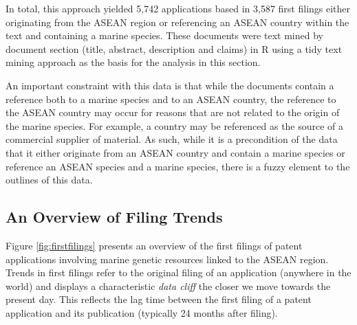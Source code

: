 \documentclass[]{book}
\theoremstyle{definition}
\theoremstyle{definition}
\theoremstyle{definition}
\theoremstyle{remark}
\begin{document}
In total, this approach yielded 5,742 applications based in 3,587 first
filings either originating from the ASEAN region or referencing an ASEAN
country within the text and containing a marine species. These documents
were text mined by document section (title, abstract, description and
claims) in R using a tidy text mining approach as the basis for the
analysis in this section.

An important constraint with this data is that while the documents
contain a reference both to a marine species and to an ASEAN country,
the reference to the ASEAN country may occur for reasons that are not
related to the origin of the marine species. For example, a country may
be referenced as the source of a commercial supplier of material. As
such, while it is a precondition of the data that it either originate
from an ASEAN country and contain a marine species or reference an ASEAN
species and a marine species, there is a fuzzy element to the outlines
of this data.

\hypertarget{an-overview-of-filing-trends}{%
\subsection{An Overview of Filing
Trends}\label{an-overview-of-filing-trends}}

Figure \ref{fig:firstfilings} presents an overview of the first filings
of patent applications involving marine genetic resources linked to the
ASEAN region. Trends in first filings refer to the original filing of an
application (anywhere in the world) and displays a characteristic
\emph{data cliff} the closer we move towards the present day. This
reflects the lag time between the first filing of a patent application
and its publication (typically 24 months after filing).
\end{document}
